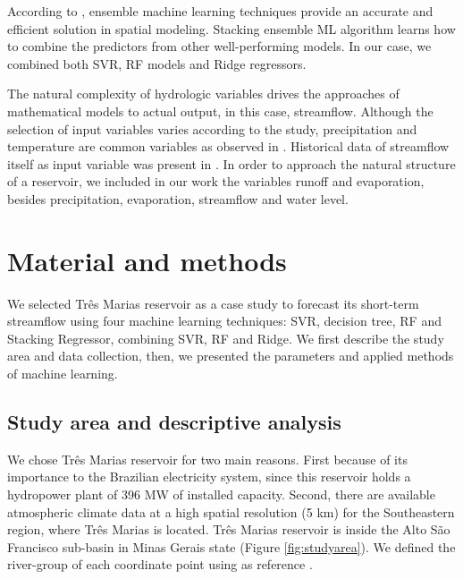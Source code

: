 \documentclass[12pt]{article}
\begin{document}
According to \cite{dou}, ensemble machine learning techniques
provide an accurate and efficient solution in spatial modeling. Stacking ensemble ML algorithm learns how to combine the predictors from other well-performing models. In our case, we combined both SVR, RF models and Ridge regressors.

The natural complexity of hydrologic variables drives the approaches of mathematical models to actual output, in this case, streamflow. Although the selection of input variables varies according to the study, precipitation and temperature are common variables as observed in \cite{kassem2020predicting,essenfelder2020smart,bhatta2019evaluation}. Historical data of streamflow itself as input variable was present in \cite{li}. In order to approach the natural structure of a reservoir, we included in our work the variables runoff and evaporation, besides precipitation, evaporation, streamflow and water level.

\section{Material and methods}

We selected Três Marias reservoir as a case study to forecast its short-term streamflow using four machine learning techniques: SVR, decision tree, RF and Stacking Regressor, combining SVR, RF and Ridge. We first describe the study area and data collection, then, we presented the parameters and applied methods of machine learning.

\subsection{Study area and descriptive analysis}
We chose Três Marias reservoir for two main reasons. First because of its importance to the Brazilian electricity system, since this reservoir holds a hydropower plant of 396 MW of installed capacity. Second, there are available atmospheric climate data at a high spatial resolution (5 km) for the Southeastern region, where Três Marias is located. Três Marias reservoir is inside the Alto São Francisco sub-basin in Minas Gerais state (Figure \ref{fig:studyarea}). We defined the river-group of each coordinate point using as reference \cite{fundep}.
\end{document}
